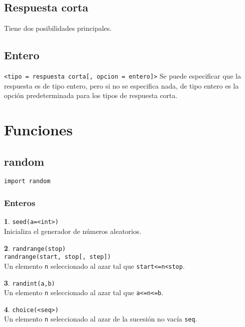 \documentclass[12pt]{article}
\theoremstyle{definition}
\newtheorem{funcion}{}[section]
\begin{document}
\subsection{Respuesta corta}

Tiene dos posibilidades principales.

\subsection{Entero}

\noindent \verb|<tipo = respuesta corta[, opcion = entero]>|
Se puede especificar que la respuesta es de tipo entero, pero si no se especifica nada, de tipo entero es la opción predeterminada para los tipos de respuesta corta.


\section{Funciones}

\subsection{random}
\noindent \verb|import random|

\subsubsection{Enteros}

\begin{funcion}
  \verb|seed(a=<int>)| \\[1ex]
  Inicializa el generador de números aleatorios.
\end{funcion}

\begin{funcion}
  \verb|randrange(stop)| \\
  \verb|randrange(start, stop[, step])| \\[1ex]
  Un elemento \verb|n| seleccionado al azar tal que \verb|start<=n<stop|.
\end{funcion}

\begin{funcion}
  \verb|randint(a,b)| \\[1ex]
  Un elemento \verb|n| seleccionado al azar tal que \verb|a<=n<=b|.
\end{funcion}

\begin{funcion}
  \verb|choice(<seq>)| \\[1ex]
  Un elemento \verb|n| seleccionado al azar de la sucesión no vacía \verb|seq|.
\end{funcion}
\end{document}
